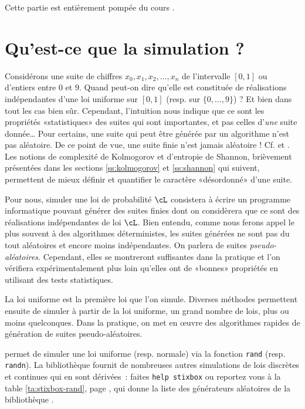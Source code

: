 Cette partie est entièrement pompée du cours \cite{ChaDjelil}.

%
%
\chapter{Qu'est-ce que la simulation ?}
%
%

Considérons une suite de chiffres $x_0,x_1,x_2,\ldots,x_n$ de l'intervalle $[0,1]$
ou d'entiers entre $0$ et $9$. Quand peut-on dire qu'elle est constituée de
réalisations indépendantes d'une loi uniforme sur $[0,1]$ (resp. sur
$\{0,\ldots,9\}$) ? Et bien dans tout les cas bien sûr. Cependant, l'intuition nous
indique que ce sont les propriétés «statistiques» des suites qui sont
importantes, et pas celles d'\emph{une} suite donnée\ldots{} Pour certains, une
suite qui peut être générée par un algorithme n'est pas aléatoire. De ce point
de vue, une suite finie n'est jamais aléatoire ! Cf. \cite[chap. IV, page
73]{bouleau} et \cite{knuth-taocp-2-3}. Les notions de complexité de
Kolmogorov et d'entropie de Shannon, brièvement présentées dans les sections
\ref{ss:kolmogorov} et \ref{ss:shannon} qui suivent, permettent de mieux
définir et quantifier le caractère «désordonné» d'une suite.

Pour nous, simuler une loi de probabilité $\cL$ consistera à écrire un
programme informatique pouvant générer des suites finies dont on considèrera
que ce sont des réalisations indépendantes de loi $\cL$. Bien entendu, comme
nous ferons appel le plus souvent à des algorithmes déterministes, les suites
générées ne sont pas du tout aléatoires et encore moins indépendantes. On
parlera de suites \emph{pseudo-aléatoires}. Cependant, elles se montreront
suffisantes dans la pratique et l'on vérifiera expérimentalement plus loin
qu'elles ont de «bonnes» propriétés en utilisant des tests statistiques.

La loi uniforme est la première loi que l'on simule. Diverses méthodes
permettent ensuite de simuler à partir de la loi uniforme, un grand nombre de
lois, plus ou moins quelconques. Dans la pratique, on met en {\oe}uvre des
algorithmes rapides de génération de suites pseudo-aléatoires.

\ML{} permet de simuler une loi uniforme (resp. normale) via la fonction
\texttt{rand} (resp. \texttt{randn}). La bibliothèque \SB{} fournit de
nombreuses autres simulations de lois discrètes et continues qui en sont
dérivées~: faites \texttt{help stixbox} ou reportez vous à la table
\ref{ta:stixbox-rand}, page \pageref{ta:stixbox-rand}, qui donne la liste des
générateurs aléatoires de la bibliothèque \SB{}.

